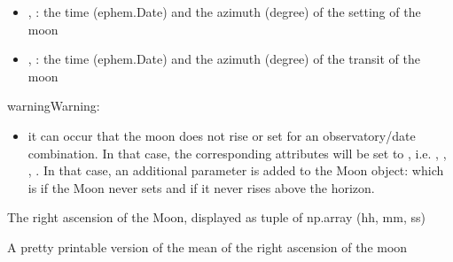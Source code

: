 \documentclass[letterpaper,10pt,english]{sphinxmanual}
\begin{document}
\begin{fulllineitems}
\begin{fulllineitems}
\begin{description}
\begin{itemize}
\item {} 
, : the time (ephem.Date) and the azimuth (degree) of the setting of the moon

\item {} 
, : the time (ephem.Date) and the azimuth (degree) of the transit of the moon

\end{itemize}

\end{description}

\begin{notice}{warning}{Warning:}\begin{itemize}
\item {} 
it can occur that the moon does not rise or set for an observatory/date combination. In that case, the corresponding attributes will be set to , i.e. , , , . In that case, an additional parameter is added to the Moon object:  which is  if the Moon never sets and  if it never rises above the horizon.

\end{itemize}
\end{notice}

\end{fulllineitems}


\begin{fulllineitems}
\label{astroobs:astroobs.Moon.ra}
The right ascension of the Moon, displayed as tuple of np.array (hh, mm, ss)

\end{fulllineitems}


\begin{fulllineitems}
\label{astroobs:astroobs.Moon.raStr}
A pretty printable version of the mean of the right ascension of the moon

\end{fulllineitems}


\end{fulllineitems}

\end{document}
